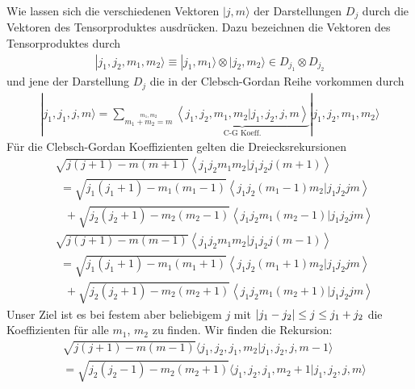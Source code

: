 Wie lassen sich die verschiedenen Vektoren $|j,m\rangle$ der Darstellungen $D_j$
durch die Vektoren des Tensorproduktes ausdrücken. Dazu bezeichnen die Vektoren
des Tensorproduktes durch
\begin{align*}
    |j_1,j_2,m_1,m_2\rangle \equiv |j_1,m_1\rangle \otimes |j_2,m_2\rangle
    \in D_{j_1} \otimes D_{j_2}
\end{align*}
und jene der Darstellung $D_j$ die in der Clebsch-Gordan Reihe vorkommen durch
\begin{align*}
    |j_1,j_1,j,m\rangle = \sum_{\stackrel{m_1,m_2}{m_1 + m_2 = m}}
    \underbrace{\left\langle j_1,j_2,m_1,m_2 | j_1,j_2,j,m \right\rangle}_{\text{C-G Koeff.}}
    |j_1,j_2,m_1,m_2\rangle
\end{align*}
Für die Clebsch-Gordan Koeffizienten gelten die Dreiecksrekursionen
\begin{align*}
    &\sqrt{j(j+1) - m(m+1)} \left\langle j_1 j_2 m_1 m_2 | j_1 j_2 j(m+1) \right\rangle
    \\
    &\hspace{5pt} = \sqrt{j_1(j_1 + 1) - m_1(m_1 -1)} \left\langle j_1 j_2 (m_1 -1) m_2 | j_1 j_2 j m \right\rangle
    \\
    &\hspace{10pt} + \sqrt{j_2(j_2 + 1) - m_2(m_2 - 1)} \left\langle j_1 j_2 m_1 (m_2 - 1) | j_1 j_2 j m \right\rangle
\end{align*}
\begin{align*}
    &\sqrt{j(j+1) - m(m-1)} \left\langle j_1 j_2 m_1 m_2 | j_1 j_2 j(m-1) \right\rangle
    \\
    &\hspace{5pt} = \sqrt{j_1(j_1 + 1) - m_1(m_1 + 1)} \left\langle j_1 j_2 (m_1 + 1) m_2 | j_1 j_2 j m \right\rangle
    \\
    &\hspace{10pt} + \sqrt{j_2(j_2 + 1) - m_2(m_2 + 1)} \left\langle j_1 j_2 m_1 (m_2 + 1) | j_1 j_2 j m \right\rangle
\end{align*}
Unser Ziel ist es bei festem aber beliebigem $j$ mit $\left\vert j_1 - j_2 \right\vert \leq j
\leq j_1 + j_2$ die Koeffizienten für alle $m_1$, $m_2$ zu finden.
Wir finden die Rekursion:
\begin{align*}
    &\sqrt{j(j+1) - m(m-1)} \langle j_1 , j_2 , j_1 , m_2 | j_1 , j_2 , j , m-1 \rangle
    \\
    &= \sqrt{j_2(j_2 - 1) - m_2 (m_2 + 1)} \langle j_1 , j_2 , j_1 , m_2 + 1 | j_1 , j_2 , j , m \rangle
\end{align*}

